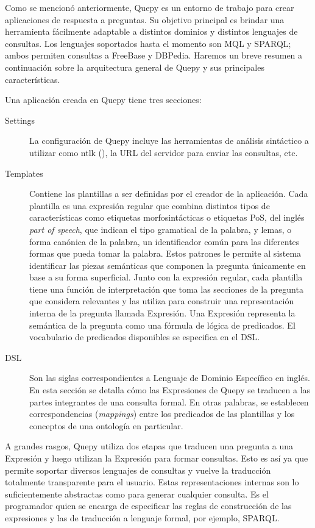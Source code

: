 Como se mencionó anteriormente, Quepy es un entorno de trabajo para crear aplicaciones de respuesta a preguntas. Su objetivo principal es brindar una herramienta fácilmente adaptable a distintos dominios y distintos lenguajes de consultas. Los lenguajes soportados hasta el momento son MQL y SPARQL; ambos permiten consultas a FreeBase y DBPedia. Haremos un breve resumen a continuación sobre la arquitectura general de Quepy y sus principales características.

Una aplicación creada en Quepy tiene tres secciones:
\begin{description}
    \item[Settings] La configuración de Quepy incluye las herramientas de análisis sintáctico a utilizar como ntlk (\citet{nltk}), la URL del servidor para enviar las consultas, etc.
    \item[Templates] Contiene las plantillas a ser definidas por el creador de la aplicación. Cada plantilla es una expresión regular que combina distintos tipos de características como etiquetas morfosintácticas o etiquetas PoS, del inglés \textit{part of speech}, que indican el tipo gramatical de la palabra, y lemas, o forma canónica de la palabra, un identificador común para las diferentes formas que pueda tomar la palabra.  Estos patrones le permite al sistema identificar las piezas semánticas que componen la pregunta únicamente en base a su forma superficial. Junto con la expresión regular, cada plantilla tiene una función de interpretación que toma las secciones de la pregunta que considera relevantes y las utiliza para construir una representación interna de la pregunta llamada Expresión. Una Expresión representa la semántica de la pregunta como una fórmula de lógica de predicados. El vocabulario de predicados disponibles se especifica en el DSL.
    \item[DSL] Son las siglas correspondientes a Lenguaje de Dominio Específico en inglés. En esta sección se detalla cómo las Expresiones de Quepy se traducen a las partes integrantes de una consulta formal. En otras palabras, se establecen correspondencias (\textit{mappings}) entre los predicados de las plantillas y los conceptos de una ontología en particular.
\end{description}

A grandes rasgos, Quepy utiliza dos etapas que traducen una pregunta a una Expresión y luego utilizan la Expresión para formar consultas. Esto es así ya que permite soportar diversos lenguajes de consultas y vuelve la traducción totalmente transparente para el usuario. Estas representaciones internas son lo suficientemente abstractas como para generar cualquier consulta. Es el programador quien se encarga de especificar las reglas de construcción de las expresiones y las de traducción a lenguaje formal, por ejemplo, SPARQL.

